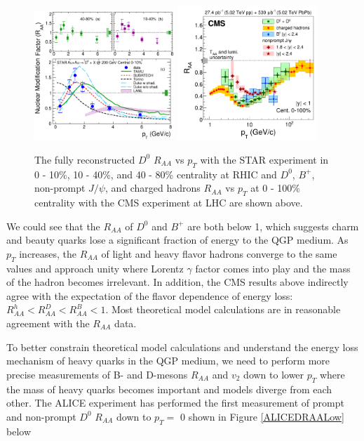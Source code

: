 \begin{figure}[hbtp]
\begin{center}
\includegraphics[width=0.47\textwidth]{Figures/Chapter2/STARRAA.eps}
\includegraphics[width=0.47\textwidth]{Figures/Chapter2/CMSRAA.png}
\caption{The fully reconstructed $D^0$ $R_{AA}$ vs $p_T$ with the STAR experiment in 0 - 10\%, 10 - 40\%, and 40 - 80\% centrality at RHIC and $D^0$, $B^+$, non-prompt $J/\psi$, and charged hadrons $R_{AA}$ vs $p_T$ at 0 - 100\% centrality with the CMS experiment at LHC are shown above.}
\label{HQRAA}
\end{center}
\end{figure}   

We could see that the $R_{AA}$ of $D^0$ and $B^+$ are both below 1, which suggests charm and beauty quarks lose a significant fraction of energy to the QGP medium. As $p_T$ increases, the $R_{AA}$ of light and heavy flavor hadrons converge to the same values and approach unity where Lorentz $\gamma$ factor comes into play and the mass of the hadron becomes irrelevant. In addition, the CMS results above indirectly agree with the expectation of the flavor dependence of energy loss: $R_{AA}^{h} < R_{AA}^{D} < R_{AA}^{B} < 1$. Most theoretical model calculations are in reasonable agreement with the $R_{AA}$ data. 

To better constrain theoretical model calculations and understand the energy loss mechanism of heavy quarks in the QGP medium, we need to perform more precise measurements of B- and D-mesons $R_{AA}$ and $v_2$ down to lower $p_T$ where the mass of heavy quarks becomes important and models diverge from each other. The ALICE experiment has performed the first measurement of prompt and non-prompt $D^0$ $R_{AA}$ down to $p_T =$ 0 shown in Figure \ref{ALICEDRAALow} below


